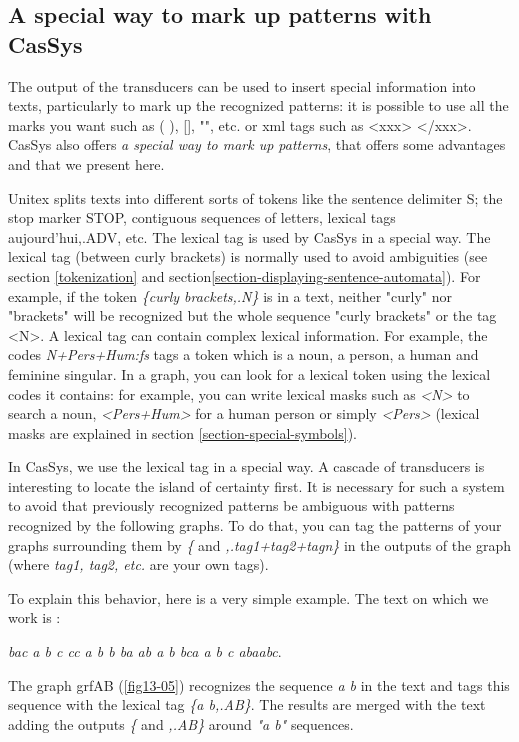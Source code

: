 \subsection{A special way to mark up patterns with CasSys}

The output of the transducers can be used to insert special information into texts, particularly to mark up the recognized patterns: it is 
possible to use all the marks you want such as ( ), [], "", etc. or xml tags such as <xxx> </xxx>.\\
CasSys also offers\textit{ a special way to mark up patterns}, that offers some advantages and that we present here.  

\bigskip
\noindent Unitex splits texts into different sorts of tokens like the sentence delimiter {S}; the stop marker {STOP}, contiguous 
sequences of letters, lexical tags {aujourd'hui,.ADV}, etc.
The lexical tag is used by CasSys in a special way. The lexical tag (between curly brackets) is normally used to avoid ambiguities (see section \ref{tokenization} and section\ref{section-displaying-sentence-automata}). 
For example, if the token \emph{\{curly brackets,.N\}} is in a text, neither "curly" nor "brackets" will be recognized but the whole sequence 
"curly brackets" or the tag <N>.
A lexical tag can contain complex lexical information. For example, the codes \emph{N+Pers+Hum:fs} tags a token which is a noun, a person, a human and feminine singular. In a graph, you can look for a lexical token using the lexical codes it contains: for example, you can write lexical masks such as \emph{<N>} to search a noun, \emph{<Pers+Hum>} for a human person or simply \emph{<Pers>} (lexical masks are explained in section \ref{section-special-symbols}).
 
\bigskip
\noindent In CasSys, we use the lexical tag in a special way. A cascade of transducers is interesting to locate the island of certainty first. It is necessary for such a system to avoid that previously recognized patterns be ambiguous with patterns recognized by the following graphs. To do that, you can tag the patterns of your graphs surrounding them by \emph{\{} and \emph{,.tag1+tag2+tagn\}} in the outputs of the graph (where \emph{tag1, tag2, etc.} are your own tags).

\bigskip
\noindent To explain this behavior, here is a very simple example. The text on which we work is :

\emph{bac a b c cc a b b ba ab a b bca a b c abaabc}.

\bigskip
\noindent The graph grfAB (\ref{fig13-05}) recognizes the sequence \emph{a b} in the text and tags this sequence with the lexical tag \textit{\{a b,.AB\}}. The results are merged with the text adding the outputs \emph{\{ }and \emph{,.AB\}} around \textit{"a b"} sequences. 

